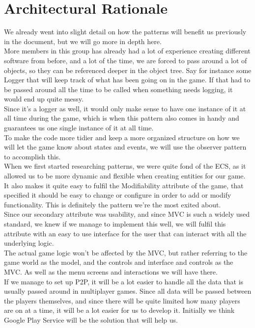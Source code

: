 \section{Architectural Rationale}
We already went into slight detail on how the patterns will benefit us previously in the document, but we will go more in depth here.
\\More members in this group has already had a lot of experience creating different software from before, and a lot of the time, we are forced to pass around a lot of objects, so they can be referenced deeper in the object tree. Say for instance some Logger that will keep track of what has been going on in the game. If that had to be passed around all the time to be called when something needs logging, it would end up quite messy. 
\\Since it's a logger as well, it would only make sense to have one instance of it at all time during the game, which is when this pattern also comes in handy and guarantees us one single instance of it at all time.
\\ To make the code more tidier and keep a more organized structure on how we will let the game know about states and events, we will use the observer pattern to accomplish this.
\\ When we first started researching patterns, we were quite fond of the ECS, as it allowed us to be more dynamic and flexible when creating entities for our game. It also makes it quite easy to fulfil the Modifiability attribute of the game, that specified it should be easy to change or configure in order to add or modify functionality. This is definitely the pattern we're the most exited about.
\\ Since our secondary attribute was usability, and since MVC is such a widely used standard, we knew if we manage to implement this well, we will fulfil this attribute with an easy to use interface for the user that can interact with all the underlying logic.
\\The actual game logic won't be affected by the MVC, but rather referring to the game world as the model, and the controls and interface and controls as the MVC. As well as the menu screens and interactions we will have there.
\\ If we manage to set up P2P, it will be a lot easier to handle all the data that is usually passed around in multiplayer games. Since all data will be passed between the players themselves, and since there will be quite limited how many players are on at a time, it will be a lot easier for us to develop it. Initially we think Google Play Service will be the solution that will help us.
